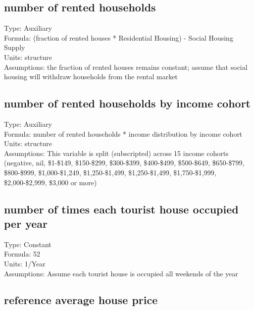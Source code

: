 \documentclass[
  11pt,
]{book}
\begin{document}
\hypertarget{number-of-rented-households}{%
\subsection{number of rented households}\label{number-of-rented-households}}

Type: Auxiliary\\
Formula: (fraction of rented houses * Residential Housing) - Social Housing Supply\\
Units: structure\\
Assumptions: the fraction of rented houses remains constant; assume that social housing will withdraw households from the rental market

\hypertarget{number-of-rented-households-by-income-cohort}{%
\subsection{number of rented households by income cohort}\label{number-of-rented-households-by-income-cohort}}

Type: Auxiliary\\
Formula: number of rented households * income distribution by income cohort\\
Units: structure\\
Assumptions: This variable is split (subscripted) across 15 income cohorts (negative, nil, \$1-\$149, \$150-\$299, \$300-\$399, \$400-\$499, \$500-\$649, \$650-\$799, \$800-\$999, \$1,000-\$1,249, \$1,250-\$1,499, \$1,250-\$1,499, \$1,750-\$1,999, \$2,000-\$2,999, \$3,000 or more)

\hypertarget{number-of-times-each-tourist-house-occupied-per-year}{%
\subsection{number of times each tourist house occupied per year}\label{number-of-times-each-tourist-house-occupied-per-year}}

Type: Constant\\
Formula: 52\\
Units: 1/Year\\
Assumptions: Assume each tourist house is occupied all weekends of the year

\hypertarget{reference-average-house-price}{%
\subsection{reference average house price}\label{reference-average-house-price}}
\end{document}

